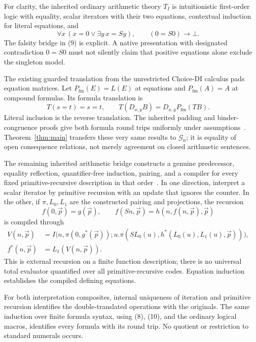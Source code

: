 \documentclass[11pt]{article}
\theoremstyle{definition}\newtheorem{definition}[theorem]{Definition}
\theoremstyle{remark}\newtheorem{remark}[theorem]{Remark}
\newcommand{\Gn}{\mathcal G_{\mathrm n}}
\begin{document}
For clarity, the inherited ordinary arithmetic theory $T_I$ is
intuitionistic first-order logic with equality, scalar iterators with
their two equations, contextual induction for literal equations, and
\[
 \forall x\,(x=0\lor\exists y\,x=Sy),\qquad
                  (0=S0)\to\bot.                       \tag{9}
\]
The falsity bridge in (9) is explicit. A native presentation with
designated contradiction $0=S0$ must not silently claim that positive
equations alone exclude the singleton model.

The existing guarded translation from the unrestricted Choice-DI
calculus pads equation matrices. Let $P_\mathrm{fm}(E)=L(E)$ at
equations and $P_\mathrm{fm}(A)=A$ at compound formulas. Its formula
translation is
\[
 T(s=t)=s=t,\qquad T(D_{x,y}B)=D_{x,y}P_\mathrm{fm}(TB).   \tag{10}
\]
Literal inclusion is the reverse translation. The inherited padding
and binder-congruence proofs give both formula round trips uniformly
under assumptions~\cite{guarded}. Theorem~\ref{thm:main} transfers
these very same results to $\Gn$; it is equality of open consequence
relations, not merely agreement on closed arithmetic sentences.

The remaining inherited arithmetic bridge constructs a genuine
predecessor, equality reflection, quantifier-free induction, pairing,
and a compiler for every fixed primitive-recursive description in that
order~\cite{bridge,lean}. In one direction, interpret a scalar iterator
by primitive recursion with an update that ignores the counter. In the
other, if $\pi,L_0,L_1$ are the constructed pairing and projections,
the recursion
\[
 f(0,\vec p)=g(\vec p),\qquad
 f(Sn,\vec p)=h(n,f(n,\vec p),\vec p)
\]
is compiled through
\[
 \begin{aligned}
 V(n,\vec p)&=I\bigl(n,\pi(0,g^*(\vec p));
          u.\pi(SL_0(u),h^*(L_0(u),L_1(u),\vec p))\bigr),\\
 f^*(n,\vec p)&=L_1(V(n,\vec p)).
 \end{aligned}                                         \tag{11}
\]
This is external recursion on a finite function description; there is
no universal total evaluator quantified over all primitive-recursive
codes. Equation induction establishes the compiled defining equations.

For both interpretation composites, internal uniqueness of iteration
and primitive recursion identifies the double-translated operations
with the originals. The same induction over finite formula syntax,
using (8), (10), and the ordinary logical macros, identifies every
formula with its round trip. No quotient or restriction to standard
numerals occurs.
\end{document}
